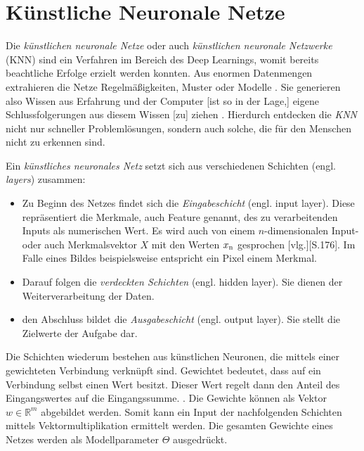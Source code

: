\section{Künstliche Neuronale Netze}
\label{KNN}

Die \textit{künstlichen neuronale Netze} oder auch \textit{künstlichen neuronale Netzwerke} (KNN) sind ein Verfahren im Bereich des Deep Learnings, womit bereits beachtliche Erfolge erzielt werden konnten. Aus enormen Datenmengen extrahieren die Netze \glqq Regelmäßigkeiten, Muster oder Modelle\grqq{} \cite[S. 40]{13}. 
Sie generieren also \glqq Wissen aus Erfahrung\grqq{} \cite[S. 40]{13} und \glqq der Computer [ist so in der Lage,] eigene Schlussfolgerungen aus diesem Wissen [zu] ziehen\grqq{} \cite[S. 33]{12}.
Hierdurch entdecken die \textit{KNN} nicht nur schneller Problemlösungen, sondern auch solche, die für den Menschen nicht zu erkennen sind. \cite[vgl.][S. 40]{13}

Ein \textit{künstliches neuronales Netz} setzt sich aus verschiedenen Schichten (engl. \textit{layers}) zusammen:

\begin{itemize}
	\item Zu Beginn des Netzes findet sich die \textit{Eingabeschicht} (engl. input layer). Diese repräsentiert die Merkmale, auch Feature genannt, des zu verarbeitenden Inputs als numerischen Wert. Es wird auch von einem $n$-dimensionalen Input- oder auch Merkmalsvektor $X$ mit den Werten $x\textsubscript{n}$ gesprochen [vlg.][S.176]\cite{14}. Im Falle eines Bildes beispielsweise entspricht ein Pixel einem Merkmal.
	\item Darauf folgen die \textit{verdeckten Schichten} (engl. hidden layer). Sie dienen der Weiterverarbeitung der Daten.
	\item den Abschluss bildet die \textit{Ausgabeschicht} (engl. output layer). Sie stellt die Zielwerte der Aufgabe dar. \\
	\cite[vgl. ][S.72]{12}
\end{itemize}
Die Schichten wiederum bestehen aus künstlichen Neuronen, die mittels einer gewichteten Verbindung verknüpft sind. Gewichtet bedeutet, dass auf ein Verbindung selbst einen Wert besitzt. Dieser Wert regelt dann \glqq den Anteil des Eingangswertes auf die Eingangssumme.\grqq{} \cite[S. 28]{13}. Die Gewichte können als Vektor $w \in \mathbb{R}^m$ abgebildet werden. Somit kann ein Input der nachfolgenden Schichten mittels Vektormultiplikation ermittelt werden. Die gesamten Gewichte eines Netzes werden als Modellparameter $\Theta$ ausgedrückt.

